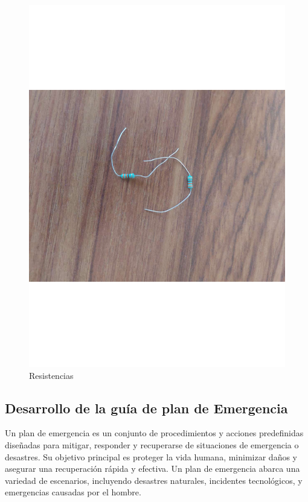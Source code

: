     \begin{figure}[H]
        \centering
        \includegraphics[trim = {0mm 0mm 0mm 0mm},clip,scale=0.2]{10/Img/resistencias.pdf}
        \caption{Resistencias}
        \label{Resistencias}
    \end{figure}
%
%
\subsection{Desarrollo de la guía de plan de Emergencia}

Un plan de emergencia es un conjunto de procedimientos y acciones predefinidas diseñadas para mitigar, responder y recuperarse de situaciones de emergencia o desastres.\cite{Plan}
\newline
Su objetivo principal es proteger la vida humana, minimizar daños y asegurar una recuperación rápida y efectiva. Un plan de emergencia abarca una variedad de escenarios, incluyendo desastres naturales, incidentes tecnológicos, y emergencias causadas por el hombre.
%
%
